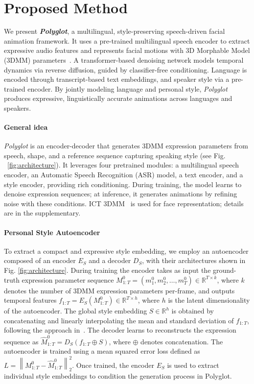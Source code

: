 \documentclass[a4paper, 10pt, conference]{ieeeconf}      %
\begin{document}
\section{Proposed Method}
\label{sec:method}
We present \textit{\textbf{Polyglot}}, a multilingual, style-preserving speech-driven facial animation framework. It uses a pre-trained multilingual speech encoder to extract expressive audio features and represents facial motions with 3D Morphable Model (3DMM) parameters~\cite{blanz1999morphable}. A transformer-based denoising network models temporal dynamics via reverse diffusion, guided by classifier-free conditioning. Language is encoded through transcript-based text embeddings, and speaker style via a pre-trained encoder. By jointly modeling language and personal style, \textit{Polyglot} produces expressive, linguistically accurate animations across languages and speakers.

\paragraph{General idea} \textit{Polyglot} is an encoder-decoder that generates 3DMM expression parameters from speech, shape, and a reference sequence capturing speaking style (see Fig. ~\ref{fig:architecture}). It leverages four pretrained modules: a multilingual speech encoder, an Automatic Speech Recognition (ASR) model, a text encoder, and a style encoder, providing rich conditioning. During training, the model learns to denoise expression sequences; at inference, it generates animations by refining noise with these conditions. ICT 3DMM~\cite{ict} is used for face representation; details are in the supplementary.

\paragraph{Personal Style Autoencoder} 
To extract a compact and expressive style embedding, we employ an autoencoder composed of an encoder \(E_S\) and a decoder \(D_S\), with their architectures shown in Fig. \ref{fig:architecture}. During training the encoder takes as input the ground-truth expression parameter sequence \(M_{1:T}^0 = (m_1^0, m_2^0, \dots, m_T^0) \in \mathbb{R}^{T \times k}\), where \(k\) denotes the number of 3DMM expression parameters per-frame, and outputs temporal features \(f_{1:T} = E_S(M_{1:T}^0) \in \mathbb{R}^{T \times h} \), where \( h \) is the latent dimensionality of the autoencoder. 
The global style embedding \(S  \in \mathbb{R}^{h}\) is obtained by concatenating and linearly interpolating the mean and standard deviation of \(f_{1:T}\), following the approach in~\cite{zhang2024personatalkbringattentionpersona}. The decoder learns to reconstructs the expression sequence as \(\hat{M}_{1:T}^0 = D_S(f_{1:T} \oplus S)\), where \(\oplus\) denotes concatenation. 
The autoencoder is trained using a mean squared error loss defined as \(L = \left\| M_{1:T}^0 - \hat{M}_{1:T}^0 \right\|_2^2\). Once trained, the encoder \(E_S\) is used to extract individual style embeddings to condition the generation process in Polyglot.
\end{document}
